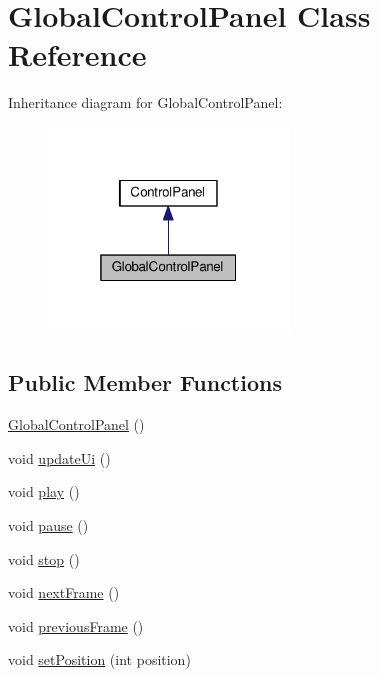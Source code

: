 \hypertarget{classGUI_1_1GlobalControlPanel}{}\section{Global\+Control\+Panel Class Reference}
\label{classGUI_1_1GlobalControlPanel}


Inheritance diagram for Global\+Control\+Panel\+:
\nopagebreak
\begin{figure}[H]
\begin{center}
\leavevmode
\includegraphics[width=181pt]{classGUI_1_1GlobalControlPanel__inherit__graph}
\end{center}
\end{figure}
\subsection*{Public Member Functions}
\begin{DoxyCompactItemize}
\item 
\hyperlink{classGUI_1_1GlobalControlPanel_ac00e18718e628cd9f3dc83bdf8fd9fb9}{Global\+Control\+Panel} ()
\item 
void \hyperlink{classGUI_1_1GlobalControlPanel_ae13c7f95f1ceda0fec18d18c3d7619f6}{update\+Ui} ()
\item 
void \hyperlink{classGUI_1_1GlobalControlPanel_a6d58098c6cf63c241ed03bc797256bb1}{play} ()
\item 
void \hyperlink{classGUI_1_1GlobalControlPanel_a7167f5c196fc5e167bfabde1a730e81d}{pause} ()
\item 
void \hyperlink{classGUI_1_1GlobalControlPanel_a8c528baf37154d347366083f0f816846}{stop} ()
\item 
void \hyperlink{classGUI_1_1GlobalControlPanel_a365329da56f8b07f8c95027ba967bbc3}{next\+Frame} ()
\item 
void \hyperlink{classGUI_1_1GlobalControlPanel_a3c96ed37c70ebc0b32c527a04e1536d1}{previous\+Frame} ()
\item 
void \hyperlink{classGUI_1_1GlobalControlPanel_a1aa68f77243229daea38d59bc5145d35}{set\+Position} (int position)
\end{DoxyCompactItemize}
